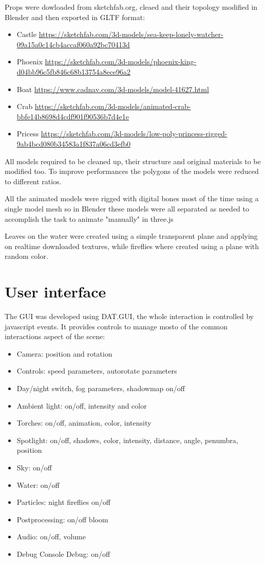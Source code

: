 \documentclass[10pt,a4paper]{article}
\begin{document}
Props were dowloaded from sketchfab.org, cleaed and their topology modified in Blender and then exported in GLTF format:

\begin{itemize}
 \item Castle \url{https://sketchfab.com/3d-models/sea-keep-lonely-watcher-09a15a0c14cb4accaf060a92bc70413d}
 \item Phoenix \url{https://sketchfab.com/3d-models/phoenix-king-d04bb96c5fb846c68b13754a8ece96a2}
 \item Boat \url{https://www.cadnav.com/3d-models/model-41627.html}
 \item Crab \url{https://sketchfab.com/3d-models/animated-crab-bbfe14b8698d4cdf901f90536b7d4e1e}
 \item Pricess \url{https://sketchfab.com/3d-models/low-poly-princess-rigged-9ab4bcd080b34583a1f837a06cd3efb0}
\end{itemize}

All models required to be cleaned up, their structure and original materials to be modified too. To improve performances the polygons of the models were reduced to different ratios.

All the animated models were rigged with digital bones most of the time using a single model mesh so in Blender these models were all separated as needed to accomplish the task to animate "manually" in three.js

Leaves on the water were created using a simple transparent plane and applying on realtime downloaded textures, while fireflies where created using a plane with random color.

\section{User interface}

The GUI was developed using DAT.GUI, the whole interaction is controlled by javascript events. It provides controls to manage mosto of the common interactions aspect of the scene:
 
 \begin{itemize}
 \item Camera: position and rotation
 \item Controls: speed parameters, autorotate parameters
 \item Day/night switch, fog parameters, shadowmap on/off
 \item Ambient light: on/off, intensity and color
 \item Torches: on/off, animation, color, intensity
 \item Spotlight: on/off, shadows, color, intensity, distance, angle, penumbra, position
 \item Sky: on/off
 \item Water: on/off
 \item Particles: night fireflies on/off
 \item Postprocessing: on/off bloom
 \item Audio: on/off, volume
 \item Debug Console Debug: on/off
 \end{itemize}
 
\end{document}
